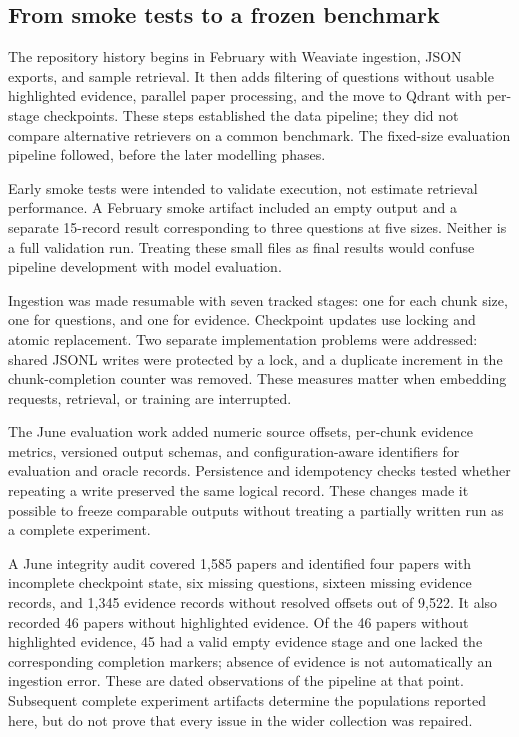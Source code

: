 \subsection{From smoke tests to a frozen benchmark}
The repository history begins in February with Weaviate ingestion,
JSON exports, and sample retrieval. It then adds filtering of questions
without usable highlighted evidence, parallel paper processing, and
the move to Qdrant with per-stage checkpoints. These steps established
the data pipeline; they did not compare alternative retrievers on a
common benchmark. The fixed-size evaluation pipeline followed, before
the later modelling phases.

Early smoke tests were intended to validate execution, not estimate
retrieval performance. A February smoke artifact included an empty
output and a separate 15-record result corresponding to three questions
at five sizes. Neither is a full validation run. Treating these small
files as final results would confuse pipeline development with model
evaluation.

Ingestion was made resumable with seven tracked stages: one for each
chunk size, one for questions, and one for evidence. Checkpoint updates
use locking and atomic replacement. Two separate implementation problems
were addressed: shared JSONL writes were protected by a lock, and a
duplicate increment in the chunk-completion counter was removed.
These measures matter when embedding requests, retrieval, or training
are interrupted.

The June evaluation work added numeric source offsets, per-chunk
evidence metrics, versioned output schemas, and configuration-aware
identifiers for evaluation and oracle records. Persistence and
idempotency checks tested whether repeating a write preserved the same
logical record. These changes made it possible to freeze comparable
outputs without treating a partially written run as a complete experiment.

A June integrity audit covered 1,585 papers and identified four papers
with incomplete checkpoint state, six missing questions, sixteen missing
evidence records, and 1,345 evidence records without resolved offsets
out of 9,522. It also recorded 46 papers without highlighted evidence.
Of the 46 papers without highlighted evidence, 45 had a valid empty
evidence stage and one lacked the corresponding completion markers;
absence of evidence is not automatically an ingestion error.
These are dated observations of the pipeline at that point. Subsequent
complete experiment artifacts determine the populations reported here,
but do not prove that every issue in the wider collection was repaired.

